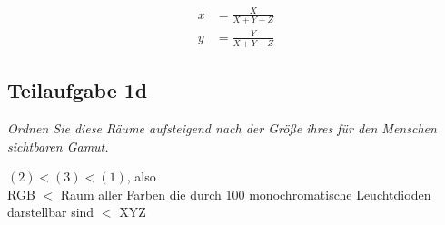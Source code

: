 \documentclass[a4paper]{scrartcl}
\begin{document}
\begin{align}
    x &= \frac{X}{X + Y + Z}\\
    y &= \frac{Y}{X + Y + Z}
\end{align}

\subsection*{Teilaufgabe 1d}
\textit{Ordnen Sie diese Räume aufsteigend nach der Größe ihres für den
Menschen sichtbaren Gamut.}

$(2) < (3) < (1)$, also\\

RGB $<$ Raum aller Farben die durch 100 monochromatische Leuchtdioden
darstellbar sind $<$ XYZ
\end{document}
